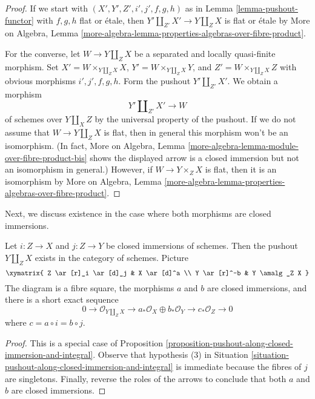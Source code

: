\begin{proof}
If we start with $(X', Y', Z', i', j', f, g, h)$
as in Lemma \ref{lemma-pushout-functor} with $f, g, h$ flat
or \'etale, then $Y' \amalg_{Z'} X' \to Y \amalg_Z X$ is flat
or \'etale by More on Algebra, Lemma
\ref{more-algebra-lemma-properties-algebras-over-fibre-product}.

\medskip\noindent
For the converse, let
$W \to Y \amalg_Z X$ be a separated and locally quasi-finite morphism.
Set $X' = W \times_{Y \amalg_Z X} X$, $Y' = W \times_{Y \amalg_Z X} Y$, and
$Z' = W \times_{Y \amalg_Z X} Z$ with obvious morphisms $i', j', f, g, h$.
Form the pushout $Y' \amalg_{Z'} X'$. We obtain a morphism
$$
Y' \amalg_{Z'} X' \longrightarrow W
$$
of schemes over $Y \amalg_X Z$ by the universal property of the
pushout. If we do not assume that $W \to Y \amalg_Z X$ is flat,
then in general this morphism won't be an isomorphism.
(In fact, More on Algebra, Lemma
\ref{more-algebra-lemma-module-over-fibre-product-bis}
shows the displayed arrow is a closed immersion but not an isomorphism
in general.) However, if $W \to Y \times_Z X$ is flat, then
it is an isomorphism by More on Algebra, Lemma
\ref{more-algebra-lemma-properties-algebras-over-fibre-product}.
\end{proof}

\noindent
Next, we discuss existence in the case where
both morphisms are closed immersions.

\begin{lemma}
\label{lemma-pushout-along-closed-immersions}
Let $i : Z \to X$ and $j : Z \to Y$ be closed immersions of schemes.
Then the pushout $Y \amalg_Z X$ exists in the category of schemes. Picture
$$
\xymatrix{
Z \ar[r]_i \ar[d]_j & X \ar[d]^a \\
Y \ar[r]^-b & Y \amalg_Z X
}
$$
The diagram is a fibre square, the morphisms $a$ and $b$
are closed immersions, and there is a short exact sequence
$$
0 \to \mathcal{O}_{Y \amalg_Z X} \to
a_*\mathcal{O}_X \oplus b_*\mathcal{O}_Y \to
c_*\mathcal{O}_Z \to 0
$$
where $c = a \circ i = b \circ j$.
\end{lemma}

\begin{proof}
This is a special case of
Proposition \ref{proposition-pushout-along-closed-immersion-and-integral}.
Observe that hypothesis (3) in
Situation \ref{situation-pushout-along-closed-immersion-and-integral}
is immediate because
the fibres of $j$ are singletons. Finally, reverse the roles of the arrows
to conclude that both $a$ and $b$ are closed immersions.
\end{proof}

